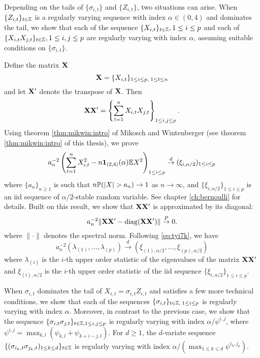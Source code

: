 Depending on the tails of $\{\sigma_{i,t}\}$ and $\{Z_{i,t}\}$,
two situations can arise. When $\{Z_{i,t}\}_{t \in \integers}$
is a regularly varying sequence with index $\alpha \in (0, 4)$
and dominates the tail, we show that each of the sequence
$\{X_{i,t}\}_{t \in \integers}, 1 \leq i \leq p$ and each of
$\{X_{i,t} X_{j,t}\}_{t \in \integers}, 1\leq i,j \leq p$
are regularly varying with index $\alpha$, assuming suitable
conditions on $\{\sigma_{i,t}\}$.

Define the matrix $\mtx X$
\[
\mtx X = \{X_{i,t}\}_{1 \leq i \leq p,\;1 \leq t \leq n}
\]
and let $\mtx X'$ denote the transpose of $\mtx X$. Then
\[
\mtx{XX'} =
\left\{\sum_{t=1}^n X_{i,t} X_{j,t}\right\}_{1 \leq i,j \leq p}.
\]
Using theorem \ref{thm:mikwin:intro} of Mikosch and Wintenberger
\cite{mikosch:wintenberger:2016}
(see theorem \ref{thm:mikwin:intro} of this thesis), we prove 
\[
a_n^{-2} \left(
\sum_{t=1}^n X_{i,t}^2 - n \I_{(2,4)}(\alpha) \E X^2
\right)_{1 \leq i \leq p}
\overset{d}{\to}
(\xi_{i, \alpha/2})_{1 \leq i \leq p}
\]
where $\{a_n\}_{n\geq 1}$ is such that $n\P(|X| > a_n) \to 1$
as $n \to \infty$,
and $\{\xi_{i, \alpha/2}\}_{1 \leq i \leq p}$ is an iid sequence of
$\alpha/2$-stable random variable.
See chapter \ref{ch:bernoulli} for details.
Built on this result, we show that $\mtx{XX'}$
is approximated by its diagonal:
\begin{equation}
  \label{eq:tyi7k}
  a_n^{-2} \|\mtx{X X'} - \diag(\mtx{X X'}) \|
  \overset{P}{\to} 0.
\end{equation}
where $\|\cdot\|$ denotes the spectral norm. Following
\eqref{eq:tyi7k}, we have
\[
a_n^{-2} (\lambda_{(1)}, \ldots, \lambda_{(p)})
\overset{d}{\to}
(\xi_{(1), \alpha/2}, \dots, \xi_{(p), \alpha/2})
\]
where $\lambda_{(i)}$ is the $i$-th upper order statistic of the
eigenvalues of the matrix $\mtx{XX'}$ and $\xi_{(i), \alpha/2}$ is
the $i$-th upper order statistic of the iid sequence
$\{\xi_{i, \alpha/2}\}_{1 \leq i \leq p}$.

When $\sigma_{i,t}$ dominates the tail of $X_{i,t} = \sigma_{i,t} Z_{i,t}$
and satisfies a few more
technical conditions, we show that each of the sequences
$\{\sigma_{i,t}\}_{t \in \integers,\; 1 \leq i \leq p}$
is regularly varying with index $\alpha$. Moreover, in contrast to the
previous case, we show that the sequence
$\{\sigma_{i,t} \sigma_{j,t}\}_{t \in \integers, 1 \leq i,j \leq p}$
is regularly varying with index $\alpha/\psi^{i,j}$, where
$\psi^{i,j} = \max_{k,l}(\psi_{k,l} + \psi_{k+i-j, l})$.
For $d \geq 1$, the $d$-variate sequence
$\{(\sigma_{i_k, t} \sigma_{j_k, t})_{1 \leq k \leq d}\}_{t \in \integers}$
is regularly varying with index
$\alpha /(\max_{1 \leq k \leq d} \psi^{i_k, j_k})$.

